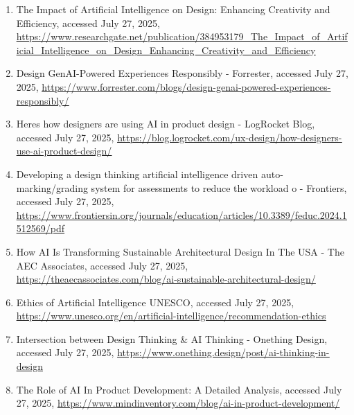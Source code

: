 \documentclass[
  12pt,
  a4paper,
  bibliography=totoc,
  numbers=noenddot
]{scrartcl}
\begin{document}
\begin{enumerate}
\item
  The Impact of Artificial Intelligence on Design: Enhancing Creativity
  and Efficiency, accessed July 27, 2025,
  \href{https://www.researchgate.net/publication/384953179_The_Impact_of_Artificial_Intelligence_on_Design_Enhancing_Creativity_and_Efficiency}{\ul{https://www.researchgate.net/publication/384953179\_The\_Impact\_of\_Artificial\_Intelligence\_on\_Design\_Enhancing\_Creativity\_and\_Efficiency}}
\item
  Design GenAI-Powered Experiences Responsibly - Forrester, accessed
  July 27, 2025,
  \href{https://www.forrester.com/blogs/design-genai-powered-experiences-responsibly/}{\ul{https://www.forrester.com/blogs/design-genai-powered-experiences-responsibly/}}
\item
  Here\textquotesingle s how designers are using AI in product design -
  LogRocket Blog, accessed July 27, 2025,
  \href{https://blog.logrocket.com/ux-design/how-designers-use-ai-product-design/}{\ul{https://blog.logrocket.com/ux-design/how-designers-use-ai-product-design/}}
\item
  Developing a design thinking artificial intelligence driven
  auto-marking/grading system for assessments to reduce the workload o -
  Frontiers, accessed July 27, 2025,
  \href{https://www.frontiersin.org/journals/education/articles/10.3389/feduc.2024.1512569/pdf}{\ul{https://www.frontiersin.org/journals/education/articles/10.3389/feduc.2024.1512569/pdf}}
\item
  How AI Is Transforming Sustainable Architectural Design In The USA -
  The AEC Associates, accessed July 27, 2025,
  \href{https://theaecassociates.com/blog/ai-sustainable-architectural-design/}{\ul{https://theaecassociates.com/blog/ai-sustainable-architectural-design/}}
\item
  Ethics of Artificial Intelligence \textbar{} UNESCO, accessed July 27,
  2025,
  \href{https://www.unesco.org/en/artificial-intelligence/recommendation-ethics}{\ul{https://www.unesco.org/en/artificial-intelligence/recommendation-ethics}}
\item
  Intersection between Design Thinking \& AI Thinking - Onething Design,
  accessed July 27, 2025,
  \href{https://www.onething.design/post/ai-thinking-in-design}{\ul{https://www.onething.design/post/ai-thinking-in-design}}
\item
  The Role of AI In Product Development: A Detailed Analysis, accessed
  July 27, 2025,
  \href{https://www.mindinventory.com/blog/ai-in-product-development/}{\ul{https://www.mindinventory.com/blog/ai-in-product-development/}}

\end{enumerate}
\end{document}
